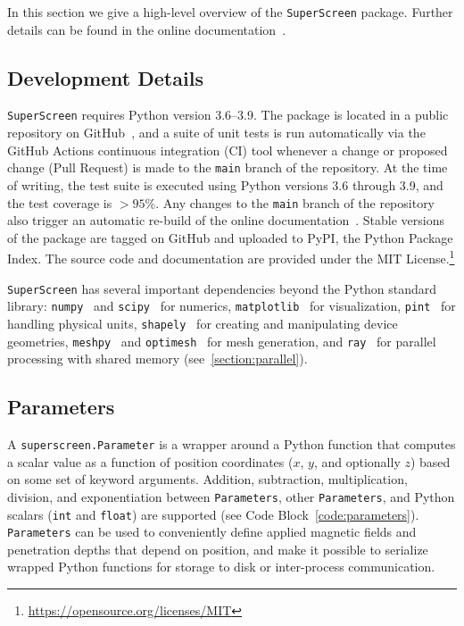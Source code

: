 \documentclass[final,3p,times]{elsarticle}
\newcommand{\inline}[1]{\texttt{#1}\xspace}
\newcommand{\SuperScreen}{\inline{SuperScreen}}
\begin{document}
In this section we give a high-level overview of the \SuperScreen package. Further details can be found in the online documentation~\cite{superscreen-rtd}.

\subsection{Development Details}
\label{section:overview:development}

\SuperScreen requires Python version 3.6--3.9. The package is located in a public repository on GitHub~\cite{superscreen}, and a suite of unit tests is run automatically via the GitHub Actions continuous integration (CI) tool whenever a change or proposed change (Pull Request) is made to the \inline{main} branch of the repository. At the time of writing, the test suite is executed using Python versions 3.6 through 3.9, and the test coverage is $>95\%$. Any changes to the \inline{main} branch of the repository also trigger an automatic re-build of the online documentation~\cite{superscreen-rtd}. Stable versions of the package are tagged on GitHub and uploaded to PyPI, the Python Package Index. The source code and documentation are provided under the MIT License.\footnote{\href{https://opensource.org/licenses/MIT}{https://opensource.org/licenses/MIT}}

\SuperScreen has several important dependencies beyond the Python standard library: \inline{numpy}~\cite{Harris2020-xv} and \inline{scipy}~\cite{Virtanen2020-zz} for numerics, \inline{matplotlib}~\cite{Hunter2007-il} for visualization, \inline{pint}~\cite{Grecco} for handling physical units, \inline{shapely}~\cite{shapely} for creating and manipulating device geometries, \inline{meshpy}~\cite{Klockner, Shewchuk, Shewchuk1996-va} and \inline{optimesh}~\cite{Schlomer2021-ua} for mesh generation, and \inline{ray}~\cite{Moritz2018-mt,ray-docs} for parallel processing with shared memory (see~\ref{section:parallel}).

\subsection{Parameters}
\label{section:overview:parameter}

A \inline{superscreen.Parameter} is a wrapper around a Python function that computes a scalar value as a function of position coordinates ($x$, $y$, and optionally $z$) based on some set of keyword arguments. Addition, subtraction, multiplication, division, and exponentiation between \inline{Parameters}, other \inline{Parameters}, and Python scalars (\inline{int} and \inline{float}) are supported (see Code Block~\ref{code:parameters}). \inline{Parameters} can be used to conveniently define applied magnetic fields and penetration depths that depend on position, and make it possible to serialize wrapped Python functions for storage to disk or inter-process communication.
\end{document}

